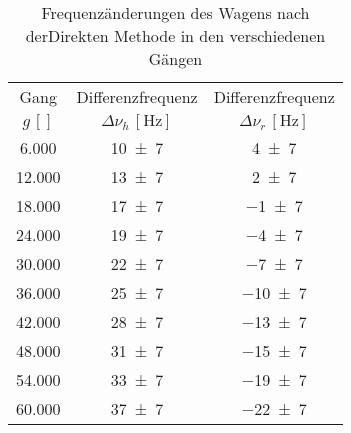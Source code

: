 \begin{table}[!h]
	\centering
	\begin{tabular}{|c|c|c|}
		\hline
		Gang & Differenzfrequenz & Differenzfrequenz\\
		$g\,[\si{}]$ & $\Delta \nu_{h}\,[\si{\hertz}]$ & $\Delta \nu_{r}\,[\si{\hertz}]$\\\hline\hline
		\num{6.000}  & \num{10(7)}  & \num{4(7)} \\
		\num{12.000}  & \num{13(7)}  & \num{2(7)} \\
		\num{18.000}  & \num{17(7)}  & \num{-1(7)} \\
		\num{24.000}  & \num{19(7)}  & \num{-4(7)} \\
		\num{30.000}  & \num{22(7)}  & \num{-7(7)} \\
		\num{36.000}  & \num{25(7)}  & \num{-10(7)} \\
		\num{42.000}  & \num{28(7)}  & \num{-13(7)} \\
		\num{48.000}  & \num{31(7)}  & \num{-15(7)} \\
		\num{54.000}  & \num{33(7)}  & \num{-19(7)} \\
		\num{60.000}  & \num{37(7)}  & \num{-22(7)} \\
		\hline
	\end{tabular}
	\caption{Frequenzänderungen des Wagens nach derDirekten Methode in den verschiedenen Gängen \label{tab:Auswertung_Frequenzänderung_Direkt}}
\end{table}